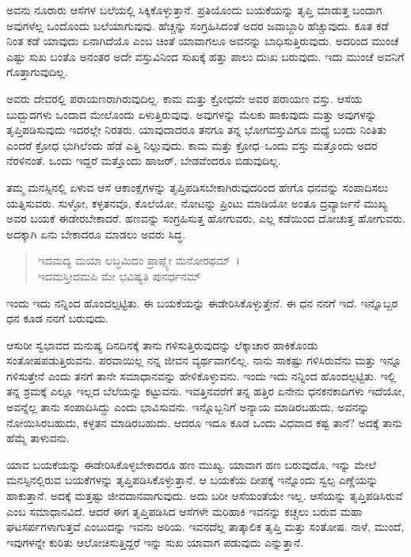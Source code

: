 ಅವನು ನೂರಾರು ಆಸೆಗಳ ಬಲೆಯಲ್ಲಿ ಸಿಕ್ಕಿಕೊಳ್ಳುತ್ತಾನೆ. ಪ್ರತಿಯೊಂದು ಬಯಕೆಯನ್ನು ತೃಪ್ತಿ ಮಾಡುತ್ತ ಬಂದಾಗ ಅವುಗಳೆಲ್ಲ ಒಂದೊಂದು ಬಲೆಯಾಗುವುವು. ಹೆಚ್ಚನ್ನು ಸಂಗ್ರಹಿಸಿದಂತೆ ಅದರ ಜವಾಬ್ದಾರಿ ಹೆಚ್ಚುವುದು. ಕೂತ ಕಡೆ ನಿಂತ ಕಡೆ ಯಾವುದು ಏನಾಗಿದೆಯೊ ಎಂಬ ಚಿಂತೆ ಯಾವಾಗಲೂ ಅವನನ್ನು ಬಾಧಿಸುತ್ತಿರುವುದು. ಅದರಿಂದ ಮುಂಚೆ ಎಷ್ಟು ಸುಖ ಬಂತೊ ಅನಂತರ ಅದೇ ವಸ್ತುವಿನಿಂದ ಸುಖಕ್ಕೆ ಹತ್ತು ಪಾಲು ದುಃಖ ಬರುವುದು. ಇದು ಮುಂಚೆ ಅವನಿಗೆ ಗೊತ್ತಾಗುವುದಿಲ್ಲ.

ಅವರು ದೇವರಲ್ಲಿ ಪರಾಯಣರಾಗಿರುವುದಿಲ್ಲ. ಕಾಮ ಮತ್ತು ಕ್ರೋಧವೇ ಅವರ ಪರಾಯಣ ವಸ್ತು. ಆಸೆಯ ಬುದ್ಬುದಗಳು ಒಂದಾದ ಮೇಲೊಂದು ಏಳುತ್ತಿರುವುವು. ಅವುಗಳನ್ನು ಮೆಲಕು ಹಾಕುವುದು ಮತ್ತು ಅವುಗಳನ್ನು ತೃಪ್ತಿಪಡಿಸುವುದು ಇದರಲ್ಲೇ ನಿರತರು. ಯಾವುದಾದರೂ ತನಗೂ ತನ್ನ ಭೋಗವಸ್ತುವಿಗೂ ಮಧ್ಯೆ ಬಂದು ನಿಂತಿತು ಎಂದರೆ ಕ್ರೋಧ ಭುಗಿಲೆಂದು ಹೆಡೆ ಎತ್ತಿ ನಿಲ್ಲುವುದು. ಕಾಮ ಮತ್ತು ಕ್ರೋಧ–ಒಂದು ವಸ್ತು ಮತ್ತೊಂದು ಅದರ ನೆರಳಿನಂತೆ. ಒಂದು ಇದ್ದರೆ ಮತ್ತೊಂದು ಹಾಜರ್, ಬೇಡವೆಂದರೂ ಬಿಡುವುದಿಲ್ಲ.

ತಮ್ಮ ಮನಸ್ಸಿನಲ್ಲಿ ಏಳುವ ಆಸೆ ಆಕಾಂಕ್ಷೆಗಳನ್ನು ತೃಪ್ತಿಪಡಿಸಬೇಕಾಗಿರುವುದರಿಂದ ಹೇಗೊ ಧನವನ್ನು ಸಂಪಾದಿಸಲು ಯತ್ನಿಸುವರು. ಸುಳ್ಳೋ, ಕಳ್ಳತನವೊ, ಕೊಲೆಯೋ, ನೋಟನ್ನು ಪ್ರಿಂಟು ಮಾಡಿಯೋ ಅಂತೂ ದ್ರವ್ಯಾರ್ಜನೆ ಮುಖ್ಯ ಅವರ ಬಯಕೆ ಈಡೇರಬೇಕಾದರೆ. ಹಣವನ್ನು ಸಂಗ್ರಹಿಸುತ್ತ ಹೋಗುವರು, ಎಲ್ಲ ಕಡೆಯಿಂದ ದೋಚುತ್ತ ಹೋಗುವರು. ಅದಕ್ಕಾಗಿ ಏನು ಬೇಕಾದರೂ ಮಾಡಲು ಅವರು ಸಿದ್ಧ.

\begin{verse}
ಇದಮದ್ಯ ಮಯಾ ಲಬ್ಧಮಿದಂ ಪ್ರಾಪ್ಸ್ಯೇ ಮನೋರಥಮ್~।\\ಇದಮಸ್ತೀದಮಪಿ ಮೇ ಭವಿಷ್ಯತಿ ಪುನರ್ಧನಮ್ 
\end{verse}

{\small ಇಂದು ಇದು ನನ್ನಿಂದ ಹೊಂದಲ್ಪಟ್ಟಿತು. ಈ ಬಯಕೆಯನ್ನು ಈಡೇರಿಸಿಕೊಳ್ಳುತ್ತೇನೆ. ಈ ಧನ ನನಗೆ ಇದೆ. ಇನ್ನೊಬ್ಬರ ಧನ ಕೂಡ ನನಗೆ ಬರುವುದು.}

ಆಸುರೀ ಸ್ವಭಾವದ ಮನುಷ್ಯ ದಿನದಿನಕ್ಕೆ ತಾನು ಗಳಿಸುತ್ತಿರುವುದನ್ನು ಲೆಕ್ಕಾಚಾರ ಹಾಕಿಕೊಂಡು ಸಂತೋಷಪಡುತ್ತಿರುವನು. ಪರವಾಯಿಲ್ಲ ನನ್ನ ಜೀವನ ವ್ಯರ್ಥವಾಗಲಿಲ್ಲ. ನಾನು ಸಾಕಷ್ಟು ಗಳಿಸಿರುವೆನು ಮತ್ತು ಇನ್ನೂ ಗಳಿಸುತ್ತೇನೆ ಎಂದು ತನಗೆ ತಾನೇ ಸಮಾಧಾನವನ್ನು ಹೇಳಿಕೊಳ್ಳುವನು. ಇಂದು ಇದು ನನ್ನಿಂದ ಹೊಂದಲ್ಪಟ್ಟಿತು. ಇಲ್ಲಿ ತನ್ನ ಶ್ರಮಕ್ಕೆ ಎಲ್ಲೂ ಇಲ್ಲದ ಬೆಲೆಯನ್ನು ಕಟ್ಟುವನು. ಇವತ್ತಿನವರೆಗೆ ತನ್ನ ಹತ್ತಿರ ಏನೇನು ಧನಕನಕಾದಿಗಳು ಇದೆಯೋ, ಅವನ್ನೆಲ್ಲ ತಾನು ಸಂಪಾದಿಸಿದ್ದು ಎಂದು ಭಾವಿಸುವನು. ಇನ್ನೊಬ್ಬನಿಗೆ ಅನ್ಯಾಯ ಮಾಡಿರಬಹುದು, ಅವನನ್ನು ನೋಯಿಸಿರಬಹುದು, ಕಳ್ಳತನ ಮಾಡಿರಬಹುದು. ಆದರೂ ಇದೂ ಕೂಡ ಒಂದು ವಿಧವಾದ ಕಷ್ಟ ತಾನೆ? ಅದಕ್ಕೆ ತಾನು ಹೆಮ್ಮೆ ತಾಳುವನು.

ಯಾವ ಬಯಕೆಯನ್ನು ಈಡೇರಿಸಿಕೊಳ್ಳಬೇಕಾದರೂ ಹಣ ಮುಖ್ಯ. ಯಾವಾಗ ಹಣ ಬರುವುದೊ, ಇನ್ನು ಮೇಲೆ ಮನಸ್ಸಿನಲ್ಲಿರುವ ಬಯಕೆಗಳನ್ನು ತೃಪ್ತಿಪಡಿಸಿಕೊಳ್ಳುತ್ತಾನೆ. ಆ ಬಯಕೆಯ ದೀಪಕ್ಕೆ ಇನ್ನೊಂದು ಸ್ವಲ್ಪ ಎಣ್ಣೆಯನ್ನು ಹಾಕುತ್ತಾನೆ. ಅದಕ್ಕೆ ಮತ್ತಷ್ಟು ಜೀವದಾನವಾಗುವುದು. ಅದು ಬರೀ ಆಸೆಯಂತೆಯೇ ಇಲ್ಲ. ಆಸೆಯನ್ನು ತೃಪ್ತಿಪಡಿಸಿರುವೆ ಎಂಬ ಸಮಾಧಾನವಿದೆ. ಆದರೆ ಈಗ ತೃಪ್ತಿಪಡಿಸಿದ ಆಸೆಗಳೇ ಮರಿಹಾಕಿ ಇವನನ್ನು ಕಚ್ಚಲು ಬರುವ ಮಹಾ ಘಟಸರ್ಪಗಳಾಗುತ್ತವೆ ಎಂಬುದನ್ನು ಇವನು ಅರಿಯ. ಇವನದೆಲ್ಲ ತಾತ್ಕಾಲಿಕ ತೃಪ್ತಿ ಮತ್ತು ಸಂತೋಷ. ನಾಳೆ, ಮುಂದೆ, ಇವುಗಳನ್ನೇ ಕುರಿತು ಆಲೋಚಿಸುತ್ತಿದ್ದರೆ ಇನ್ನು ಸುಖ ಯಾವಾಗ ಪಡುವುದು ಎನ್ನುತ್ತಾನೆ.

